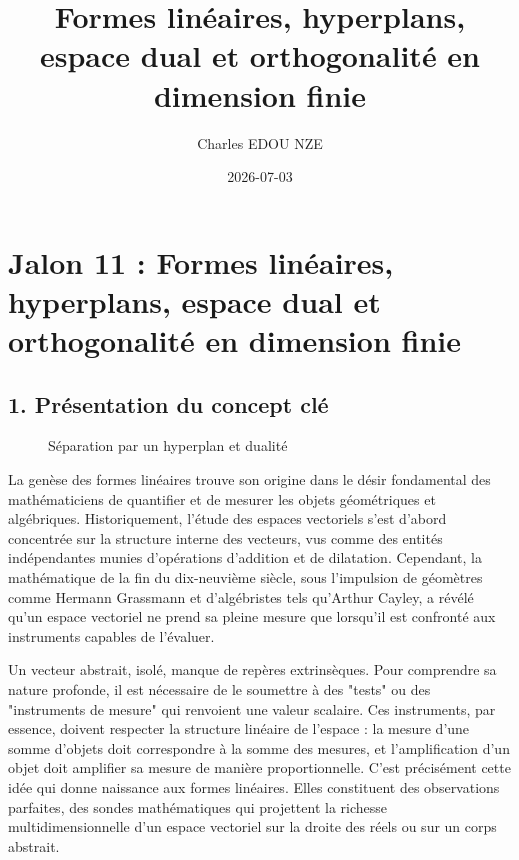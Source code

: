 \documentclass{report}
\title{Formes linéaires, hyperplans, espace dual et orthogonalité en dimension finie}
\author{Charles EDOU NZE}
\date{2026-07-03}
\begin{document}
\maketitle
\tableofcontents
\newpage

\chapter*{Jalon 11 : Formes linéaires, hyperplans, espace dual et orthogonalité en dimension finie}

\section*{1. Présentation du concept clé}

\begin{figure}[h]
\centering
{}
\caption{Séparation par un hyperplan et dualité}
\end{figure}


La genèse des formes linéaires trouve son origine dans le désir fondamental des mathématiciens de quantifier et de mesurer les objets géométriques et algébriques. Historiquement, l'étude des espaces vectoriels s'est d'abord concentrée sur la structure interne des vecteurs, vus comme des entités indépendantes munies d'opérations d'addition et de dilatation. Cependant, la mathématique de la fin du dix-neuvième siècle, sous l'impulsion de géomètres comme Hermann Grassmann et d'algébristes tels qu'Arthur Cayley, a révélé qu'un espace vectoriel ne prend sa pleine mesure que lorsqu'il est confronté aux instruments capables de l'évaluer.

Un vecteur abstrait, isolé, manque de repères extrinsèques. Pour comprendre sa nature profonde, il est nécessaire de le soumettre à des "tests" ou des "instruments de mesure" qui renvoient une valeur scalaire. Ces instruments, par essence, doivent respecter la structure linéaire de l'espace : la mesure d'une somme d'objets doit correspondre à la somme des mesures, et l'amplification d'un objet doit amplifier sa mesure de manière proportionnelle. C'est précisément cette idée qui donne naissance aux formes linéaires. Elles constituent des observations parfaites, des sondes mathématiques qui projettent la richesse multidimensionnelle d'un espace vectoriel sur la droite des réels ou sur un corps abstrait.
\end{document}
